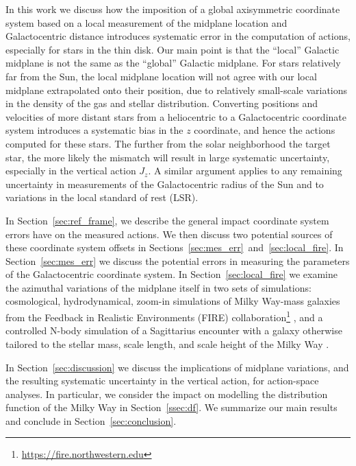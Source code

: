 \documentclass[twocolumn]{aastex62}
\begin{document}
In this work we discuss how the imposition of a global axisymmetric coordinate
system based on a local measurement of the midplane location and
Galactocentric distance introduces systematic error in the computation of
actions, especially for stars in the thin disk. Our main point is that the
``local'' Galactic midplane is not the same as the ``global'' Galactic
midplane. For stars relatively far from the Sun, the local midplane location
will not agree with our local midplane extrapolated onto their position, due
to relatively small-scale variations in the density of the gas and stellar
distribution. Converting positions and velocities of more distant stars from a
heliocentric to a Galactocentric coordinate system introduces a systematic
bias in the $z$ coordinate, and hence the actions computed for these stars.
The further from the solar neighborhood the target star, the more likely the
mismatch will result in large systematic uncertainty, especially in the
vertical action $J_z$. A similar
argument applies to any remaining uncertainty in measurements of the
Galactocentric radius of the Sun and to variations in the local standard of
rest (LSR).

In Section~\ref{sec:ref_frame}, we describe the general impact coordinate
system errors have on the measured actions. We then discuss two potential
sources of these coordinate system offsets in
Sections~\ref{sec:mes_err}~and~\ref{sec:local_fire}. In
Section~\ref{sec:mes_err} we discuss the potential errors in measuring the
parameters of the Galactocentric coordinate system. In
Section~\ref{sec:local_fire} we examine the azimuthal variations of the
midplane itself in two sets of simulations: cosmological, hydrodynamical,
zoom-in simulations of Milky Way-mass galaxies from the Feedback in Realistic
Environments (FIRE)
collaboration\footnote{\url{https://fire.northwestern.edu}}
\citep{2014MNRAS.445..581H, 2016ApJ...827L..23W, 2018MNRAS.480..800H}, and a controlled N-body
simulation of a Sagittarius encounter with a galaxy otherwise tailored to the
stellar mass, scale length, and scale height of the Milky Way
\citep{2018MNRAS.481..286L}.

In Section~\ref{sec:discussion} we discuss the implications of midplane
variations, and the resulting systematic uncertainty in the vertical action,
for action-space analyses. In particular, we consider the impact on modelling
the distribution function of the Milky Way in Section~\ref{ssec:df}. We
summarize our main results and conclude in Section~\ref{sec:conclusion}.
\end{document}
